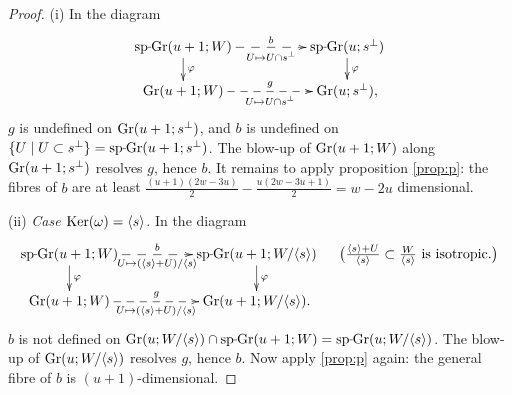 \documentclass[11pt,reqno]{amsart}
\let\mt\mapsto
\let\nit\noindent
\let\vphi\varphi
\let\lan\langle
\let\ran\rangle
\numberwithin{equation}{section}
\numberwithin{figure}{section}
\begin{document}
\begin{proof}
(i) In the diagram 
\begin{equation}\label{eq:spgrs1}
\xymatrix@R=1.5em@C=5em{
{{\rm sp{{{\vrule height2.75pt depth-2.35pt width2.3pt \kern1.7pt}}\!}Gr}}(u+1;W)\ar@{-->}[r]_-{U\mt U\cap s^\perp}^-b\ar[d]^\vphi
&
{{\rm sp{{{\vrule height2.75pt depth-2.35pt width2.3pt \kern1.7pt}}\!}Gr}}(u;s^\perp)\ar[d]^\vphi
\\ 
{{\rm Gr}}(u+1;W)\ar@{-->}[r]_-{U\mt U\cap s^\perp}^-{g}
&
{{\rm Gr}}(u;s^\perp),
}
\end{equation}
$g$ is undefined on ${{\rm Gr}}(u+1;s^\perp)$, and $b$ is undefined on 
$\{U\mid U\subset s^\perp\}={{\rm sp{{{\vrule height2.75pt depth-2.35pt width2.3pt \kern1.7pt}}\!}Gr}}(u+1;s^\perp)$. 
The blow-up of ${{\rm Gr}}(u+1;W)$ along ${{\rm Gr}}(u+1;s^\perp)$ resolves $g$, hence $b$. 
It remains to apply proposition \ref{prop:p}: the fibres of $b$ are at least 
$\frac{(u+1)(2w-3u)}{2}-\frac{u(2w-3u+1)}{2}=w-2u$ dimensional. 

\nit(ii) \textit{Case ${{\rm Ker}}(\omega)={{\lan {s}\ran}}$.}\quad 
In the diagram 
\begin{equation}\label{eq:spgrs2}\xymatrix@C=5em@R=1.5em{
{{\rm sp{{{\vrule height2.75pt depth-2.35pt width2.3pt \kern1.7pt}}\!}Gr}}(u+1;W)\ar@{-->}[r]_-{U\mt ({{\lan {s}\ran}}+U)/{{\lan {s}\ran}}}^-b\ar[d]^\vphi
&
{{\rm sp{{{\vrule height2.75pt depth-2.35pt width2.3pt \kern1.7pt}}\!}Gr}}(u+1;W/{{\lan {s}\ran}})\ar[d]^\vphi
&
\kern-4em
\big(
\text{$\frac{{{\lan {s}\ran}}+U}{{{\lan {s}\ran}}}\subset\frac{W}{{{\lan {s}\ran}}}$ is isotropic.}
\big)
\\ 
{{\rm Gr}}(u+1;W)\ar@{-->}[r]_-{U\mt ({{\lan {s}\ran}}+U)/{{\lan {s}\ran}}}^-{g}&{{\rm Gr}}(u+1;W/{{\lan {s}\ran}}).
&
}
\end{equation}
$b$ is not defined on ${{\rm Gr}}(u;W/{{\lan {s}\ran}})\cap{{\rm sp{{{\vrule height2.75pt depth-2.35pt width2.3pt \kern1.7pt}}\!}Gr}}(u+1;W)={{\rm sp{{{\vrule height2.75pt depth-2.35pt width2.3pt \kern1.7pt}}\!}Gr}}(u;W/{{\lan {s}\ran}})$. 
The blow-up of ${{\rm Gr}}(u;W/{{\lan {s}\ran}})$ resolves $g$, hence $b$.  
Now apply \ref{prop:p} again: the general fibre of $b$ is $(u+1)$-dimensional. 
\smallskip 


\end{proof}
\end{document}
